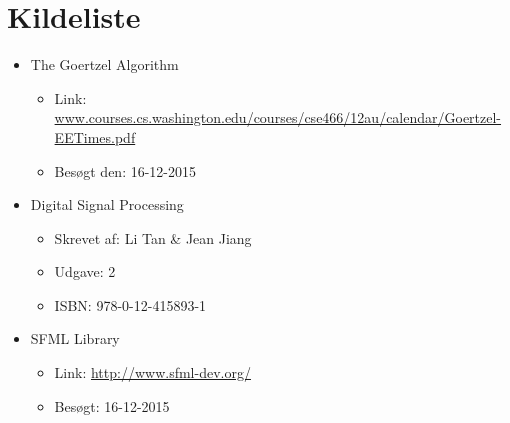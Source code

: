 \section{Kildeliste}

\begin{itemize}[noitemsep]
  \item The Goertzel Algorithm
  \begin{itemize}[noitemsep]
    \item Link: \url{www.courses.cs.washington.edu/courses/cse466/12au/calendar/Goertzel-EETimes.pdf}
    \item Besøgt den: 16-12-2015
  \end{itemize}
  \item Digital Signal Processing
  \begin{itemize}[noitemsep]
  	\item Skrevet af: Li Tan \& Jean Jiang
  	\item Udgave: 2
  	\item ISBN: 978-0-12-415893-1
  \end{itemize}
  \item SFML Library
  \begin{itemize}[noitemsep]
    \item Link: \url{http://www.sfml-dev.org/}
    \item Besøgt: 16-12-2015
  \end{itemize}
\end{itemize}